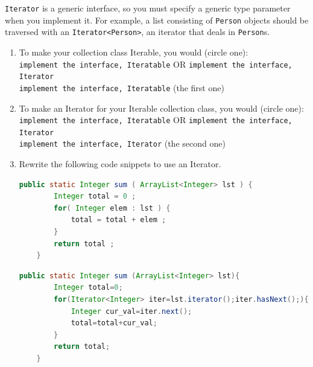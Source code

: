 \documentclass[11pt]{article}
\newenvironment{answer}{\large\lstset{basicstyle=\tiny\ttfamily}\color{white} }{}
\newenvironment{answer}{\large\lstset{basicstyle=\large\ttfamily}\color{red} }{}
\begin{document}
\begin{enumerate}
\begin{answer}
\texttt{Iterator} is a generic interface, so you must specify a generic type parameter when you implement it.
For example, a list consisting of \texttt{Person} objects should be traversed with an \texttt{Iterator<Person>}, an iterator that deals in \texttt{Person}s.
\end{answer}
\begin{enumerate}
	\item To make your collection class Iterable, you would (circle one):\\
	\texttt{implement the interface, Iteratable} OR \texttt{implement the interface, Iterator}\\
	\begin{answer}
		\texttt{implement the interface, Iteratable} (the first one)
	\end{answer}
	\item To make an Iterator for your Iterable collection class, you would (circle one):\\
	\texttt{implement the interface, Iteratable} OR \texttt{implement the interface, Iterator}\\
	\begin{answer}
	\texttt{implement the interface, Iterator} (the second one)
	\end{answer}
	\item Rewrite the following code snippets to use an Iterator.
	\begin{lstlisting}[language=java]
	public static Integer sum ( ArrayList<Integer> lst ) {
		Integer total = 0 ;
		for( Integer elem : lst ) {
			total = total + elem ;
		}
		return total ;
	}
	\end{lstlisting}
	\begin{answer}
	\begin{lstlisting}[language=java]
	public static Integer sum (ArrayList<Integer> lst){
		Integer total=0;
		for(Iterator<Integer> iter=lst.iterator();iter.hasNext();){
			Integer cur_val=iter.next(); 
			total=total+cur_val;
		}
		return total;
	}
	\end{lstlisting}
	\end{answer}

\end{enumerate}













\end{enumerate}
\end{document}
